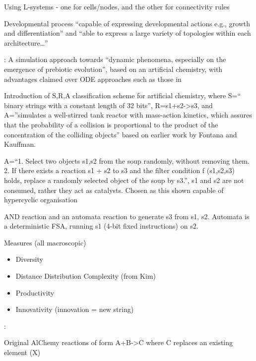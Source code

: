 Using L-systems - one for cells/nodes, and the other for connectivity rules

Developmental process ``capable of expressing developmental actions e.g., growth and differentiation'' and ``able to express a large variety of topologies within each architecture\ldots{}''

\cite{Dittrich1998}:
A simulation approach towards ``dynamic phenomena, especially on the emergence of prebiotic evolution'', based on an artificial chemistry, with advantages claimed over ODE approaches such as those in \cite{Bagley1992}

Introduction of  S,R,A classification scheme for artificial chemistry, where S=`` binary strings with a constant length of 32 bits'', R=s1+s2-\textgreater{}s3, and A=''simulates a well-stirred tank  reactor with mass-action kinetics, which assures that the probability of a collision is proportional to the product of the concentration of the colliding objects'' based on earlier work by Fontana and Kauffman.

A=``1. Select two objects s1,s2 from the soup randomly, without removing them. 2. If there exists a reaction s1 + s2 to s3 and the filter condition f (s1,s2,s3) holds, replace a randomly selected object of the soup by s3.'', s1 and s2 are not consumed, rather they act as catalysts. Chosen as this shown capable of hypercyclic organisation

AND reaction and an automata reaction to generate s3 from s1, s2. Automata is a deterministic FSA, running s1 (4-bit fixed instructions) on s2.

Measures (all macroscopic)

\begin{itemize}
	\item Diversity
	
	\item
	
	Distance Distribution Complexity (from Kim)
	
	\item
	
	Productivity
	
	\item
	
	Innovativity (innovation = new string)
	
\end{itemize}

\parencite{Fenizio2000}:

Original AlChemy reactions of form A+B-\textgreater{}C where C replaces an existing element (X)

